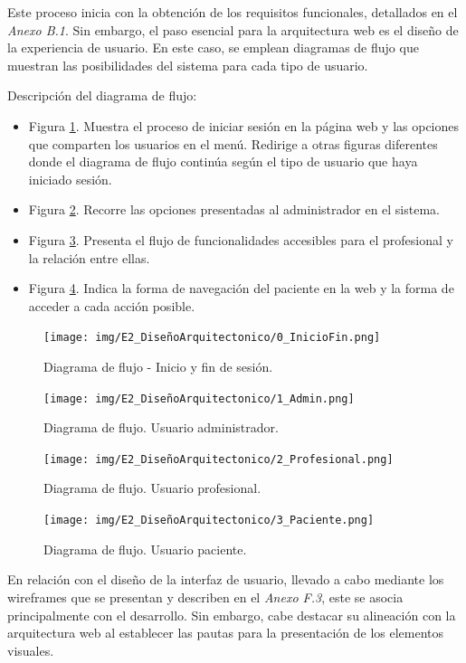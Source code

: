 Este proceso inicia con la obtención de los requisitos funcionales, detallados en el \textit{Anexo B.1}. Sin embargo, el paso esencial para la arquitectura web es el diseño de la experiencia de usuario. En este caso, se emplean diagramas de flujo que muestran las posibilidades del sistema para cada tipo de usuario.

Descripción del diagrama de flujo:
\begin{itemize}
    \item Figura \ref{fig:0_InicioFin}. Muestra el proceso de iniciar sesión en la página web y las opciones que comparten los usuarios en el menú. Redirige a otras figuras diferentes donde el diagrama de flujo continúa según el tipo de usuario que haya iniciado sesión.
    \item Figura \ref{fig:1_Admin}. Recorre las opciones presentadas al administrador en el sistema.
    \item Figura \ref{fig:2_Profesional}. Presenta el flujo de funcionalidades accesibles para el profesional y la relación entre ellas.
    \item Figura \ref{fig:3_Paciente}. Indica la forma de navegación del paciente en la web y la forma de acceder a cada acción posible.
\end{itemize}


\begin{figure}[h]
    \centering
    \texttt{[image: img/E2\_DiseñoArquitectonico/0\_InicioFin.png]}
    \caption{Diagrama de flujo - Inicio y fin de sesión.}
    \label{fig:0_InicioFin}
\end{figure}

\begin{figure}[h]
    \centering
    \texttt{[image: img/E2\_DiseñoArquitectonico/1\_Admin.png]}
    \caption{Diagrama de flujo. Usuario administrador.}
    \label{fig:1_Admin}
\end{figure}

\begin{figure}[h]
    \centering
    \texttt{[image: img/E2\_DiseñoArquitectonico/2\_Profesional.png]}
    \caption{Diagrama de flujo. Usuario profesional.}
    \label{fig:2_Profesional}
\end{figure}

\begin{figure}[h]
    \centering
    \texttt{[image: img/E2\_DiseñoArquitectonico/3\_Paciente.png]}
    \caption{Diagrama de flujo. Usuario paciente.}
    \label{fig:3_Paciente}
\end{figure}


En relación con el diseño de la interfaz de usuario, llevado a cabo mediante los wireframes que se presentan y describen en el \textit{Anexo F.3}, este se asocia principalmente con el desarrollo. Sin embargo, cabe destacar su alineación con la arquitectura web al establecer las pautas para la presentación de los elementos visuales.
